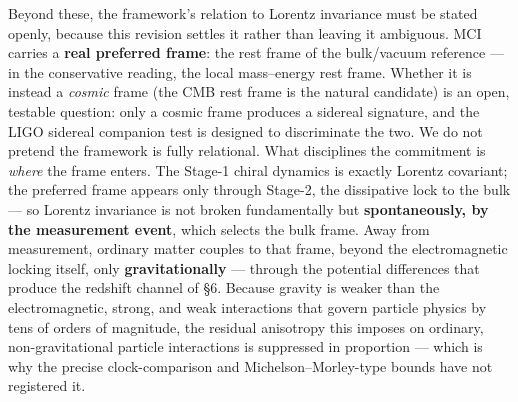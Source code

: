\documentclass[
]{article}
\begin{document}
Beyond these, the framework's relation to Lorentz invariance must be
stated openly, because this revision settles it rather than leaving it
ambiguous. MCI carries a \textbf{real preferred frame}: the rest frame
of the bulk/vacuum reference --- in the conservative reading, the local
mass--energy rest frame. Whether it is instead a \emph{cosmic} frame
(the CMB rest frame is the natural candidate) is an open, testable
question: only a cosmic frame produces a sidereal signature, and the
LIGO sidereal companion test is designed to discriminate the two. We do
not pretend the framework is fully relational. What disciplines the
commitment is \emph{where} the frame enters. The Stage-1 chiral dynamics
is exactly Lorentz covariant; the preferred frame appears only through
Stage-2, the dissipative lock to the bulk --- so Lorentz invariance is
not broken fundamentally but \textbf{spontaneously, by the measurement
event}, which selects the bulk frame. Away from measurement, ordinary
matter couples to that frame, beyond the electromagnetic locking itself,
only \textbf{gravitationally} --- through the potential differences that
produce the redshift channel of §6. Because gravity is weaker than the
electromagnetic, strong, and weak interactions that govern particle
physics by tens of orders of magnitude, the residual anisotropy this
imposes on ordinary, non-gravitational particle interactions is
suppressed in proportion --- which is why the precise clock-comparison
and Michelson--Morley-type bounds have not registered it.
\end{document}
